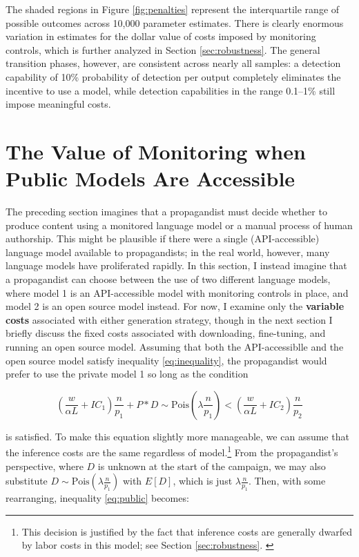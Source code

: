 \documentclass{article}
\begin{document}
The shaded regions in Figure \ref{fig:penalties} represent the interquartile range of possible outcomes across 10,000 parameter estimates. There is clearly enormous variation in estimates for the dollar value of costs imposed by monitoring controls, which is further analyzed in Section \ref{sec:robustness}. The general transition phases, however, are consistent across nearly all samples: a detection capability of 10\% probability of detection per output completely eliminates the incentive to use a model, while detection capabilities in the range 0.1–1\% still impose meaningful costs. 

\section{The Value of Monitoring when Public Models Are Accessible}
\label{sec:comparison}

The preceding section imagines that a propagandist must decide whether to produce content using a monitored language model or a manual process of human authorship. This might be plausible if there were a single (API-accessible) language model available to propagandists; in the real world, however, many language models have proliferated rapidly. \cite{workshop, solaiman} In this section, I instead imagine that a propagandist can choose between the use of two different language models, where model 1 is an API-accessible model with monitoring controls in place, and model 2 is an open source model instead. For now, I examine only the \textbf{variable costs} associated with either generation strategy, though in the next section I briefly discuss the fixed costs associated with downloading, fine-tuning, and running an open source model. Assuming that both the API-accessiblle and the open source model satisfy inequality \ref{eq:inequality}, the propagandist would prefer to use the private model 1 so long as the condition 

\begin{equation}
  \label{eq:public}
  \left( \frac{w}{\alpha L} + IC_1 \right) \frac{n}{p_1} + P * D \sim \text{Pois}\left( \lambda \frac{n}{p_1} \right) < \left( \frac{w}{\alpha L} + IC_2 \right) \frac{n}{p_2}
\end{equation}

is satisfied. To make this equation slightly more manageable, we can assume that the inference costs are the same regardless of model.\footnote{This decision is justified by the fact that inference costs are generally dwarfed by labor costs in this model; see Section \ref{sec:robustness}. \label{icequivalent}} From the propagandist's perspective, where $D$ is unknown at the start of the campaign, we may also substitute $D \sim \text{Pois}\left( \lambda \frac{n}{p_1} \right)$ with $E[D]$, which is just $\lambda \frac{n}{p_1}$. Then, with some rearranging, inequality \ref{eq:public} becomes:
\end{document}
